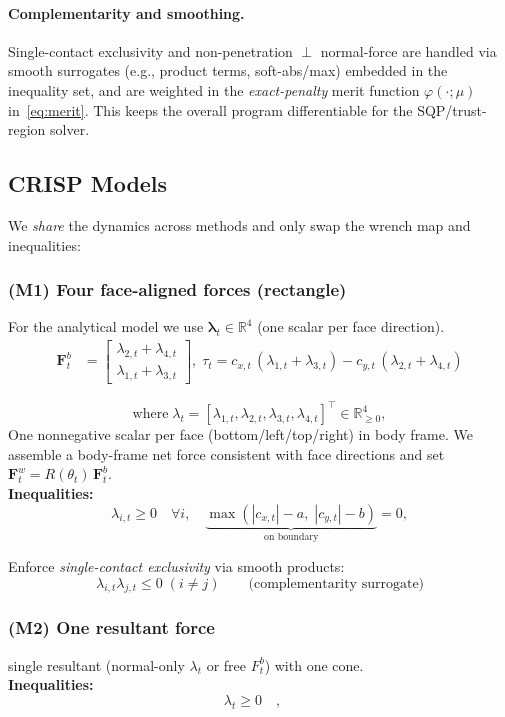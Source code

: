 \documentclass[conference]{IEEEtran}
\begin{document}
\paragraph{Complementarity and smoothing.}
Single-contact exclusivity and non-penetration $\perp$ normal-force are handled via smooth surrogates
(e.g., product terms, soft-abs/max) embedded in the inequality set, and are weighted in the
\emph{exact-penalty} merit function \(\varphi(\cdot;\mu)\) in~\eqref{eq:merit}.
This keeps the overall program differentiable for the SQP/trust-region solver.

\subsection{CRISP Models}
\label{subsec:crisp-models}
\noindent We \emph{share} the dynamics across methods and only swap the wrench map and inequalities:

\subsubsection{(M1) Four face-aligned forces (rectangle)}
For the analytical model we use $\boldsymbol{\lambda}_t\in\mathbb{R}^4$ (one scalar per face direction).
\begin{align}
\mathbf F^{b}_t &=
\begin{bmatrix}
\lambda_{2,t} + \lambda_{4,t} \\
\lambda_{1,t} + \lambda_{3,t}
\end{bmatrix},\;
\tau_t = c_{x,t}\,(\lambda_{1,t}+\lambda_{3,t}) - c_{y,t}\,(\lambda_{2,t}+\lambda_{4,t}) \label{eq:m1_force}
\end{align}

\[
\text{where}\; \lambda_t = [\lambda_{1,t},\lambda_{2,t},\lambda_{3,t},\lambda_{4,t}]^\top\in\mathbb{R}_{\ge 0}^4,
\]
One nonnegative scalar per face (bottom/left/top/right) in body frame. We assemble a body-frame net force consistent with face directions and set \(\mathbf F^w_t = R(\theta_t)\,\mathbf F^b_t\). \\
\textbf{Inequalities:}
\[
\lambda_{i,t}\ge 0\quad \forall i,
\quad
\underbrace{\max(|c_{x,t}|-a,\;|c_{y,t}|-b)}_{\text{on boundary}}=0,
\]

Enforce \emph{single-contact exclusivity} via smooth products:
\[
\lambda_{i,t}\lambda_{j,t}\le 0\;(i\neq j)\quad\quad \text{(complementarity surrogate)}
\]

\subsubsection{(M2) One resultant force} single resultant (normal-only $\lambda_t$ or free $ F^b_t$) with one cone. \\
\textbf{Inequalities:}
\[
\lambda_{t}\ge 0\quad,
\quad
\]
\end{document}
